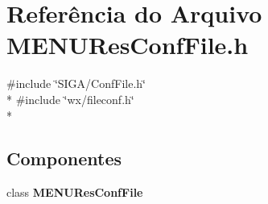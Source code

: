 \section{Referência do Arquivo M\+E\+N\+U\+Res\+Conf\+File.\+h}
\label{_m_e_n_u_res_conf_file_8h}
{\ttfamily \#include \char`\"{}S\+I\+G\+A/\+Conf\+File.\+h\char`\"{}}\\*
{\ttfamily \#include \char`\"{}wx/fileconf.\+h\char`\"{}}\\*
\subsection*{Componentes}
\begin{DoxyCompactItemize}
\item 
class {\bf M\+E\+N\+U\+Res\+Conf\+File}
\end{DoxyCompactItemize}
